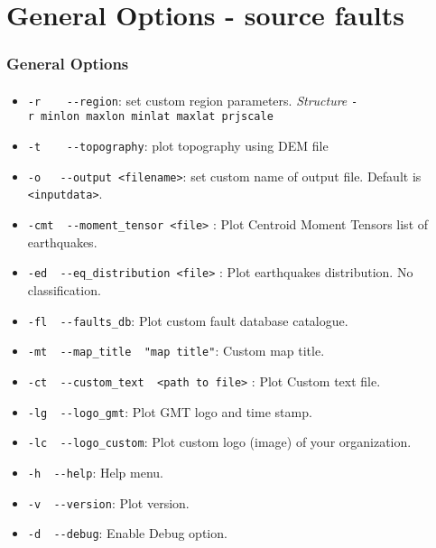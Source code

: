\section[General arg]{General Options - source faults}

\graphicspath{{Chapter4/Figs/}{Figs/}}
\begin{frame}
  \frametitle{General Options}
  \framesubtitle{}
  \label{ch4fr:genopt}
\begin{scriptsize}
\begin{itemize}
\item
  \texttt{-r\ \ \ \textbar{}\ -\/-region}: set custom region parameters.
  \emph{Structure} \texttt{-r\ minlon\ maxlon\ minlat\ maxlat\ prjscale}
\item
  \texttt{-t\ \ \ \textbar{}\ -\/-topography}: plot topography using DEM
  file
\item
  \texttt{-o\ \ \textbar{}\ -\/-output\ \textless{}filename\textgreater{}}:
  set custom name of output file. Default is
  \texttt{\textless{}inputdata\textgreater{}}.
\item
  \texttt{-cmt\ \textbar{}\ -\/-moment\_tensor\ \textless{}file\textgreater{}}
  : Plot Centroid Moment Tensors list of earthquakes.
\item
  \texttt{-ed\ \textbar{}\ -\/-eq\_distribution\ \textless{}file\textgreater{}}
  : Plot earthquakes distribution. No classification.
\item
  \texttt{-fl\ \textbar{}\ -\/-faults\_db}: Plot custom fault database
  catalogue.
\item
  \texttt{-mt\ \textbar{}\ -\/-map\_title\ \ "map\ title"}: Custom map
  title.
\item
  \texttt{-ct\ \textbar{}\ -\/-custom\_text\ \ \textless{}path\ to\ file\textgreater{}}
  : Plot Custom text file.
\item
  \texttt{-lg\ \textbar{}\ -\/-logo\_gmt}: Plot GMT logo and time stamp.
\item
  \texttt{-lc\ \textbar{}\ -\/-logo\_custom}: Plot custom logo (image)
  of your organization.
\item
  \texttt{-h\ \textbar{}\ -\/-help}: Help menu.
\item
  \texttt{-v\ \textbar{}\ -\/-version}: Plot version.
\item
  \texttt{-d\ \textbar{}\ -\/-debug}: Enable Debug option.
\end{itemize}
\end{scriptsize}
\end{frame}
\note{}

